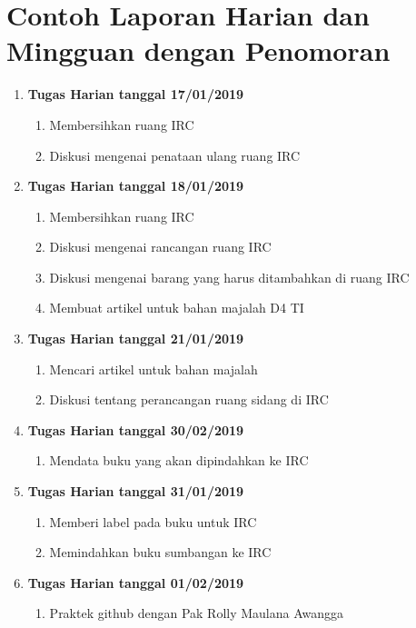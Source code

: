 \section{Contoh Laporan Harian dan Mingguan dengan Penomoran}

\begin{enumerate}
\item \textbf{Tugas Harian tanggal 17/01/2019}
\begin{enumerate}
\item Membersihkan ruang IRC
\item Diskusi mengenai penataan ulang ruang IRC
\end{enumerate}

\item \textbf{Tugas Harian tanggal 18/01/2019}
\begin{enumerate}
\item Membersihkan ruang IRC
\item Diskusi mengenai rancangan ruang IRC
\item Diskusi mengenai barang yang harus ditambahkan di ruang IRC
\item Membuat artikel untuk bahan majalah D4 TI
\end{enumerate}

\item \textbf{Tugas Harian tanggal 21/01/2019}
\begin{enumerate}
\item Mencari artikel untuk bahan majalah
\item Diskusi tentang perancangan ruang sidang di IRC
\end{enumerate}

\item \textbf{Tugas Harian tanggal 30/02/2019}
\begin{enumerate}
\item Mendata buku yang akan dipindahkan ke IRC
\end{enumerate}

\item \textbf{Tugas Harian tanggal 31/01/2019}
\begin{enumerate}
\item Memberi label pada buku untuk IRC
\item Memindahkan buku sumbangan ke IRC
\end{enumerate}

\item \textbf{Tugas Harian tanggal 01/02/2019}
\begin{enumerate}
\item Praktek github dengan Pak Rolly Maulana Awangga 
\end{enumerate}


\end{enumerate}
